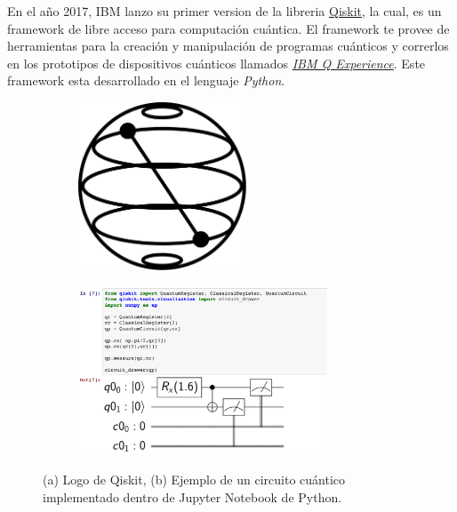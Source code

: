 En el año 2017, IBM lanzo su primer version de la libreria \href{https://qiskit.org/}{Qiskit}, la cual, es un framework de libre acceso para computación cuántica. El framework te provee de herramientas para la creación y manipulación de programas cuánticos
y correrlos en los prototipos de dispositivos cuánticos llamados \href{https://quantum-computing.ibm.com/}{\textit{IBM Q Experience}}. Este framework esta desarrollado en el lenguaje \textit{Python}. 
\begin{figure}[H]
    \begin{subfigure}{0.5\textwidth}
        \centering
        \caption{}
    \includegraphics[height=5cm]{images/Qiskit.png}
    \label{fig:logo_qiskit}
    \end{subfigure}
    \begin{subfigure}{0.5\textwidth}
        \centering
        \caption{}
    \includegraphics[height=5cm]{images/Example_qiskit.png}
    \label{fig:example_qiskit}
    \end{subfigure}
    \caption{(a) Logo de Qiskit, (b) Ejemplo de un circuito cuántico implementado dentro de Jupyter Notebook de Python.}
\end{figure}